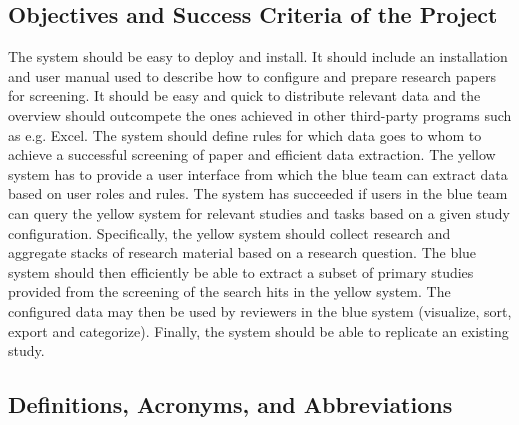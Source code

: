 \subsection{Objectives and Success Criteria of the Project}
The system should be easy to deploy and install. It should include an installation and user manual used to describe how to configure and prepare research papers for screening. It should be easy and quick to distribute relevant data and the overview should outcompete the ones achieved in other third-party programs such as e.g. Excel. The system should define rules for which data goes to whom to achieve a successful screening of paper and efficient data extraction. The yellow system has to provide a user interface from which the blue team can extract data based on user roles and rules. The system has succeeded if users in the blue team can query the yellow system for relevant studies and tasks based on a given study configuration. Specifically, the yellow system should collect research and aggregate stacks of research material based on a research question. The blue system should then efficiently be able to extract a subset of primary studies provided from the screening of the search hits in the yellow system. The configured data may then be used by reviewers in the blue system (visualize, sort, export and categorize). Finally, the system should be able to replicate an existing study.

\newpage

\subsection{Definitions, Acronyms, and Abbreviations}

